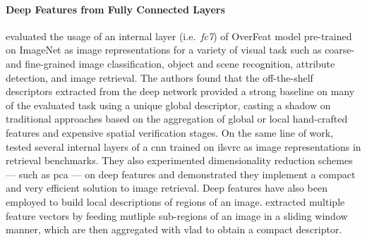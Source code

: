 \paragraph{Deep Features from Fully Connected Layers}
\citet{sharif2014cnn} evaluated the usage of an internal layer (i.e.\ \emph{fc7}) of OverFeat model pre-trained on ImageNet as image representations for a variety of visual task such as coarse- and fine-grained image classification, object and scene recognition, attribute detection, and image retrieval.
The authors found that the off-the-shelf descriptors extracted from the deep network provided a strong baseline on many of the evaluated task using a unique global descriptor, casting a shadow on traditional approaches based on the aggregation of global or local hand-crafted features and expensive spatial verification stages.
%
On the same line of work, \citet{babenko2014neural} tested several internal layers of a \gls{cnn} trained on \gls{ilsvrc} as image representations in retrieval benchmarks.
They also experimented dimensionality reduction schemes --- such as \gls{pca} --- on deep features and demonstrated they implement a compact and very efficient solution to image retrieval.
%
Deep features have also been employed to build local descriptions of regions of an image.
\citet{gong2014multi} extracted multiple feature vectors by feeding mutliple sub-regions of an image in a sliding window manner,  which are then aggregated with \gls{vlad} to obtain a compact descriptor.

